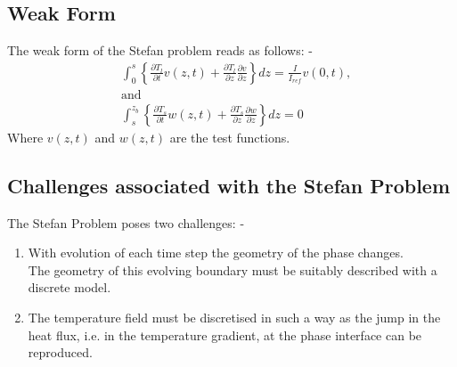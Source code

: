 \subsection{Weak Form}
The weak form of the Stefan problem reads as follows: -
\begin{subequations}
    \begin{align}
        &\int_0^s \left\{ \frac{\partial T_l}{\partial t} v(z,t) + \frac{\partial T_l}{\partial z} \frac{\partial v}{\partial z} \right \}dz = \frac{I}{I_{ref}}v(0,t), \label{eq:Stefan_Weak_formorig} \\
        \nonumber &\text{and}\\
        &\int_s^{z_{b}} \left\{ \frac{\partial T_s}{\partial t} w(z,t) + \frac{\partial T_s}{\partial z} \frac{\partial w}{\partial z} \right \}dz = 0 \label{eq:Stefan_Weak_formcalc}
    \end{align}
\end{subequations}
Where $v(z,t)$ and $w(z,t)$ are the test functions.
\subsection{Challenges associated with the Stefan Problem}
The Stefan Problem poses two challenges: -
\begin{enumerate}
    \item With evolution of each time step the geometry of the phase changes.\\
The geometry of this evolving boundary must be suitably described with a discrete model\cite{2009}. 
\item The temperature field must be discretised in such a way as the jump in the heat flux, i.e. in the temperature gradient, at the phase interface can be reproduced\cite{2009}. 
\end{enumerate}

